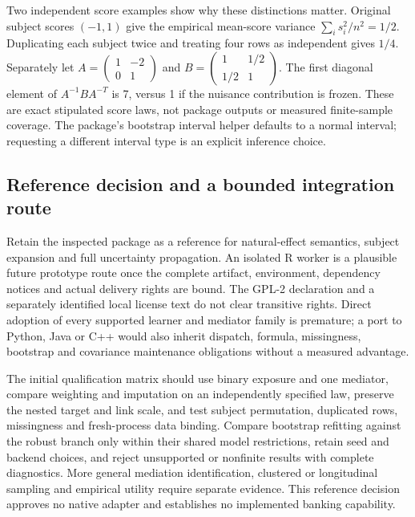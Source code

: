Two independent score examples show why these distinctions matter. Original
subject scores $(-1,1)$ give the empirical mean-score variance
$\sum_i s_i^2/n^2=1/2$. Duplicating each subject twice and treating four
rows as independent gives $1/4$. Separately let
$A=\left(\begin{smallmatrix}1&-2\\0&1\end{smallmatrix}\right)$
and $B=\left(\begin{smallmatrix}1&1/2\\1/2&1\end{smallmatrix}\right)$.
The first diagonal element of $A^{-1}BA^{-T}$ is 7, versus 1 if
the nuisance contribution is frozen. These are exact stipulated score laws,
not package outputs or measured finite-sample coverage. The package's
bootstrap interval helper defaults to a normal interval; requesting a
different interval type is an explicit inference choice.
\citep{exec23_medflex_sources,exec23_medflex_reference}

\subsection{Reference decision and a bounded integration route}
\label{exec23:medflex-decision}
Retain the inspected package as a reference for natural-effect semantics,
subject expansion and full uncertainty propagation. An isolated R worker
is a plausible future prototype route once the complete artifact, environment,
dependency notices and actual delivery rights are bound. The GPL-2 declaration
and a separately identified local license text do not clear transitive rights.
Direct adoption of every supported learner and mediator family is premature;
a port to Python, Java or C++ would also inherit dispatch, formula, missingness,
bootstrap and covariance maintenance obligations without a measured advantage.
\citep{exec23_medflex_sources}

The initial qualification matrix should use binary exposure and one mediator,
compare weighting and imputation on an independently specified law, preserve
the nested target and link scale, and test subject permutation, duplicated
rows, missingness and fresh-process data binding. Compare bootstrap refitting
against the robust branch only within their shared model restrictions,
retain seed and backend choices, and reject unsupported or nonfinite results
with complete diagnostics. More general mediation identification, clustered
or longitudinal sampling and empirical utility require separate evidence.
This reference decision approves no native adapter and establishes no
implemented banking capability.


